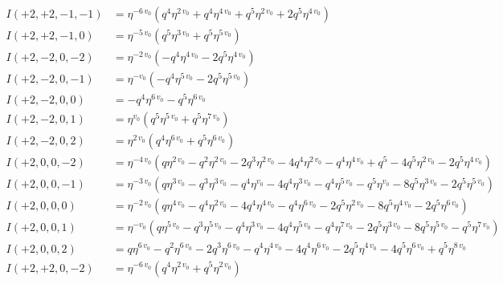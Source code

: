 \documentclass[11pt,a4paper]{article}
\begin{document}
\begin{align*}
I(+2, +2, -1, -1) &= \eta^{-6 \, v_{0}} \left( q^{4} \eta^{2 \, v_{0}} + q^{4} \eta^{4 \, v_{0}} + q^{5} \eta^{2 \, v_{0}} + 2 q^{5} \eta^{4 \, v_{0}} \right) \\
I(+2, +2, -1, 0) &= \eta^{-5 \, v_{0}} \left( q^{5} \eta^{3 \, v_{0}} + q^{5} \eta^{5 \, v_{0}} \right) \\
I(+2, -2, 0, -2) &= \eta^{-2 \, v_{0}} \left( -q^{4} \eta^{4 \, v_{0}} - 2 q^{5} \eta^{4 \, v_{0}} \right) \\
I(+2, -2, 0, -1) &= \eta^{-v_{0}} \left( -q^{4} \eta^{5 \, v_{0}} - 2 q^{5} \eta^{5 \, v_{0}} \right) \\
I(+2, -2, 0, 0) &= -q^{4} \eta^{6 \, v_{0}} - q^{5} \eta^{6 \, v_{0}} \\
I(+2, -2, 0, 1) &= \eta^{v_{0}} \left( q^{5} \eta^{5 \, v_{0}} + q^{5} \eta^{7 \, v_{0}} \right) \\
I(+2, -2, 0, 2) &= \eta^{2 \, v_{0}} \left( q^{4} \eta^{6 \, v_{0}} + q^{5} \eta^{6 \, v_{0}} \right) \\
I(+2, 0, 0, -2) &= \eta^{-4 \, v_{0}} \left( q \eta^{2 \, v_{0}} - q^{2} \eta^{2 \, v_{0}} - 2 q^{3} \eta^{2 \, v_{0}} - 4 q^{4} \eta^{2 \, v_{0}} - q^{4} \eta^{4 \, v_{0}} + q^{5} - 4 q^{5} \eta^{2 \, v_{0}} - 2 q^{5} \eta^{4 \, v_{0}} \right) \\
I(+2, 0, 0, -1) &= \eta^{-3 \, v_{0}} \left( q \eta^{3 \, v_{0}} - q^{3} \eta^{3 \, v_{0}} - q^{4} \eta^{v_{0}} - 4 q^{4} \eta^{3 \, v_{0}} - q^{4} \eta^{5 \, v_{0}} - q^{5} \eta^{v_{0}} - 8 q^{5} \eta^{3 \, v_{0}} - 2 q^{5} \eta^{5 \, v_{0}} \right) \\
I(+2, 0, 0, 0) &= \eta^{-2 \, v_{0}} \left( q \eta^{4 \, v_{0}} - q^{4} \eta^{2 \, v_{0}} - 4 q^{4} \eta^{4 \, v_{0}} - q^{4} \eta^{6 \, v_{0}} - 2 q^{5} \eta^{2 \, v_{0}} - 8 q^{5} \eta^{4 \, v_{0}} - 2 q^{5} \eta^{6 \, v_{0}} \right) \\
I(+2, 0, 0, 1) &= \eta^{-v_{0}} \left( q \eta^{5 \, v_{0}} - q^{3} \eta^{5 \, v_{0}} - q^{4} \eta^{3 \, v_{0}} - 4 q^{4} \eta^{5 \, v_{0}} - q^{4} \eta^{7 \, v_{0}} - 2 q^{5} \eta^{3 \, v_{0}} - 8 q^{5} \eta^{5 \, v_{0}} - q^{5} \eta^{7 \, v_{0}} \right) \\
I(+2, 0, 0, 2) &= q \eta^{6 \, v_{0}} - q^{2} \eta^{6 \, v_{0}} - 2 q^{3} \eta^{6 \, v_{0}} - q^{4} \eta^{4 \, v_{0}} - 4 q^{4} \eta^{6 \, v_{0}} - 2 q^{5} \eta^{4 \, v_{0}} - 4 q^{5} \eta^{6 \, v_{0}} + q^{5} \eta^{8 \, v_{0}} \\
I(+2, +2, 0, -2) &= \eta^{-6 \, v_{0}} \left( q^{4} \eta^{2 \, v_{0}} + q^{5} \eta^{2 \, v_{0}} \right) \\

\end{align*}
\end{document}
